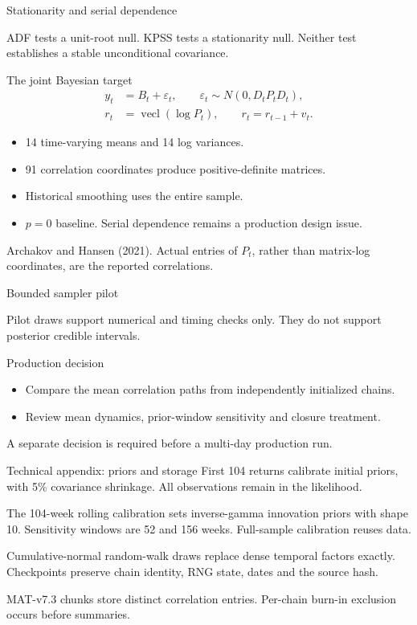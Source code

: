 \documentclass[aspectratio=169,11pt]{beamer}
\newcommand{\source}{\par\vspace{1mm}{\tiny Source: supplied market levels; generated weekly-research outputs. Native quotes.}}
\begin{document}
\begin{frame}{Stationarity and serial dependence}

\vfill\small ADF tests a unit-root null. KPSS tests a stationarity null. Neither test establishes a stable unconditional covariance.\source
\end{frame}
\begin{frame}{The joint Bayesian target}
\begin{align*}
y_t&=B_t+\varepsilon_t,\qquad\varepsilon_t\sim N(0,D_tP_tD_t),\\
r_t&=\operatorname{vecl}(\log P_t),\qquad r_t=r_{t-1}+v_t.
\end{align*}
\begin{itemize}\item 14 time-varying means and 14 log variances.\item 91 correlation coordinates produce positive-definite matrices.\item Historical smoothing uses the entire sample.\item $p=0$ baseline. Serial dependence remains a production design issue.\end{itemize}
\vfill\tiny Archakov and Hansen (2021). Actual entries of $P_t$, rather than matrix-log coordinates, are the reported correlations.
\end{frame}
\begin{frame}{Bounded sampler pilot}

\vfill\small Pilot draws support numerical and timing checks only. They do not support posterior credible intervals.
\end{frame}
\begin{frame}{Production decision}

\vspace{3mm}\begin{itemize}\item Compare the mean correlation paths from independently initialized chains.\item Review mean dynamics, prior-window sensitivity and closure treatment.\end{itemize}
\vfill\tiny A separate decision is required before a multi-day production run.
\end{frame}
\appendix
\begin{frame}{Technical appendix: priors and storage}
\small
First 104 returns calibrate initial priors, with 5\% covariance shrinkage. All observations remain in the likelihood.\par\medskip
The 104-week rolling calibration sets inverse-gamma innovation priors with shape 10. Sensitivity windows are 52 and 156 weeks. Full-sample calibration reuses data.\par\medskip
Cumulative-normal random-walk draws replace dense temporal factors exactly. Checkpoints preserve chain identity, RNG state, dates and the source hash.\par\medskip
MAT-v7.3 chunks store distinct correlation entries. Per-chain burn-in exclusion occurs before summaries.
\end{frame}
\end{document}
